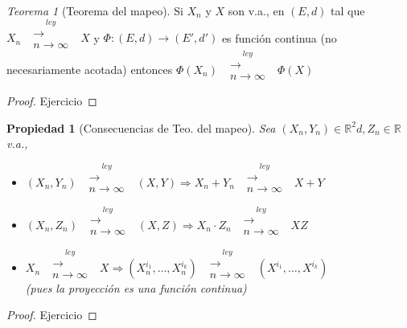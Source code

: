 \documentclass[letterpaper,11pt]{article} %
\theoremstyle{defbreak}
\theoremstyle{propbreak}
\newtheorem{property}{Propiedad}[subsection]
\theoremstyle{remark}
\theoremstyle{break}
\newtheorem{theorem}{Teorema}[subsection]
\def\ejercicio{\color{blue}Ejercicio\color{black}}
\def\demejercicio{\begin{proof}\ejercicio\end{proof}}
\begin{document}
\begin{theorem}[Teorema del mapeo]
Si $X_n$ y $X$ son v.a., en $(E,d)$ tal que $X_n\mbox{ }\overset{ley}{\substack{\longrightarrow \\n \to \infty}}\mbox{ }X$ y $\Phi:(E,d)\longrightarrow (E',d')$ es función continua (no necesariamente acotada) entonces $\Phi(X_n)\mbox{ }\overset{ley}{\substack{\longrightarrow \\n \to \infty}}\mbox{ }\Phi(X)$
\end{theorem}
\demejercicio

\begin{property}[Consecuencias de Teo. del mapeo]
Sea $(X_n,Y_n)\in\mathbb{R}^2d,Z_n\in\mathbb{R}$ v.a.,
\begin{itemize}
    \item $(X_n,Y_n)\mbox{ }\overset{ley}{\substack{\longrightarrow \\n \to \infty}}\mbox{ }(X,Y)\Longrightarrow X_n+Y_n\mbox{ }\overset{ley}{\substack{\longrightarrow \\n \to \infty}}\mbox{ }X+Y$
    \item $(X_n,Z_n)\mbox{ }\overset{ley}{\substack{\longrightarrow \\n \to \infty}}\mbox{ }(X,Z)\Longrightarrow X_n\cdot Z_n\mbox{ }\overset{ley}{\substack{\longrightarrow \\n \to \infty}}\mbox{ }XZ$
    \item $X_n\mbox{ }\overset{ley}{\substack{\longrightarrow \\n \to \infty}}\mbox{ }X \Longrightarrow (X_n^{i_1},\dots,X_n^{i_k})\mbox{ }\overset{ley}{\substack{\longrightarrow \\n \to \infty}}\mbox{ }(X^{i_1},\dots,X^{i_k})$ \\ (pues la proyección es una función continua)
\end{itemize}
\end{property}
\begin{proof}
\ejercicio
\end{proof}
\end{document}
